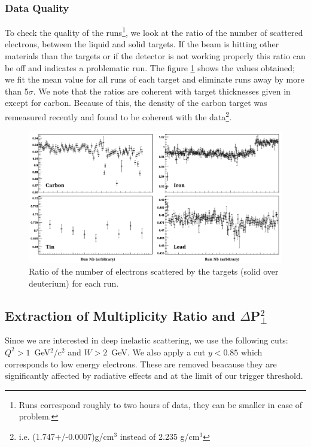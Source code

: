 \subsubsection{Data Quality}

To check the quality of the runs\footnote{Runs correspond roughly to two hours
of data, they can be smaller in case of problem.}, we look at the ratio of the number of 
scattered electrons, between the liquid and solid targets. If the beam is 
hitting other materials than the targets or if the detector is not working 
properly this ratio can be off and indicates a problematic run. The figure 
\ref{DataQ} shows the values obtained; we fit the 
mean value for all runs of each target and eliminate runs away by more than 
5$\sigma$. We note that the ratios are coherent with target thicknesses given 
in \cite{Hakobyan:2008zz} except for carbon. Because of this, the density of 
the carbon target was remeasured recently and found to be coherent with the 
data\footnote{i.e. (1.747+/-0.0007)g/cm$^3$ instead of 2.235 g/cm$^3$}.

\begin{figure}[tbp]
\centering
\includegraphics[width=15cm] {chap5-fig/TargetElRatio.png}
\caption {Ratio of the number of electrons scattered by the targets (solid over deuterium) 
for each run.}
\label{DataQ}
\end{figure}

\subsection{Extraction of Multiplicity Ratio and $\Delta$P$_\perp^2$}
\label{sec:obs}

Since we are interested in deep inelastic scattering, we use the following 
cuts: $Q^2 > 1$~GeV$^2$/c$^2$ and $W > 2$~GeV. We also apply a cut $y < 0.85$ 
which corresponds to low energy electrons. These are removed beacause they are
significantly affected by radiative effects and at the limit of our trigger 
threshold.

